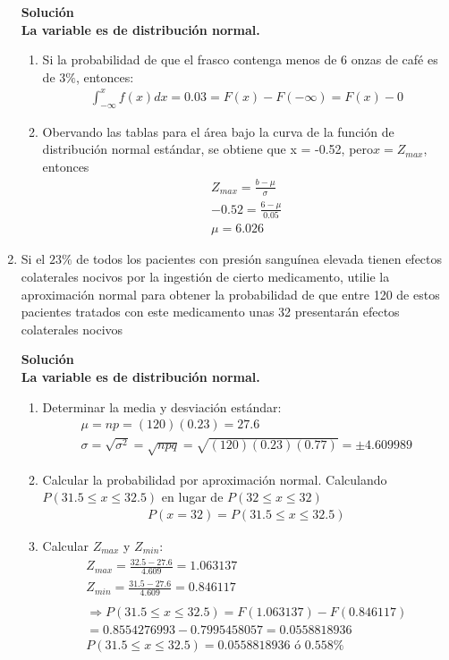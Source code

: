 \begin{enumerate}
    \textbf{Solución}\\
    \textbf{La variable es de distribución normal.}
    \begin{enumerate}
        \item Si la probabilidad de que el frasco contenga menos de 6 onzas de café es de $3\%$, entonces:
        \begin{gather*}
        \int_{-\infty}^{x}f(x)dx=0.03=F(x)-F(-\infty)=F(x)-0
        \end{gather*}
        \item Obervando las tablas para el área bajo la curva de la función de distribución normal estándar, se obtiene que x = -0.52, pero$x = Z_{max}$, entonces\\
        \begin{gather*}
        Z_{max} = \frac{b-\mu}{\sigma}\\
        -0.52=\frac{6 -\mu}{0.05}\\
        \mu = 6.026
        \end{gather*}
    \end{enumerate}
    
    \item Si el $23\%$ de todos los pacientes con presión sanguínea elevada tienen efectos colaterales nocivos por la ingestión de cierto medicamento, utilie la aproximación normal para obtener la probabilidad de que entre 120 de estos pacientes tratados con este medicamento unas 32 presentarán efectos colaterales nocivos
    
    \textbf{Solución}\\
    \textbf{La variable es de distribución normal.}
    \begin{enumerate}
        \item Determinar la media y desviación estándar:
        \begin{gather*}
        \mu =np=(120)(0.23)=27.6\\
        \sigma=\sqrt{\sigma^{2}}	= \sqrt{npq}=\sqrt{(120)(0.23)(0.77)} = \pm 4.609989
        \end{gather*}
        \item Calcular la probabilidad por aproximación normal. Calculando $P(31.5\leq x\leq32.5)$ en lugar de $P(32\leq x\leq32)$\\
        \begin{gather*}
        P(x=32)= P(31.5\leq x\leq32.5)
        \end{gather*}
        \item Calcular $Z_{max}$ y $Z_{min}$:
        \begin{gather*}
        Z_{max}=\frac{32.5-27.6}{4.609}=1.063137\\
        Z_{min}=\frac{31.5-27.6}{4.609}=0.846117\\\\
        \Rightarrow  P(31.5\leq x\leq32.5) = F(1.063137)-F(0.846117)\\
        = 0.8554276993-0.7995458057=0.0558818936\\
        P(31.5\leq x\leq32.5) = 0.0558818936 \text{ ó } 0.558\%
        \end{gather*}
    \end{enumerate}
    

\end{enumerate}
